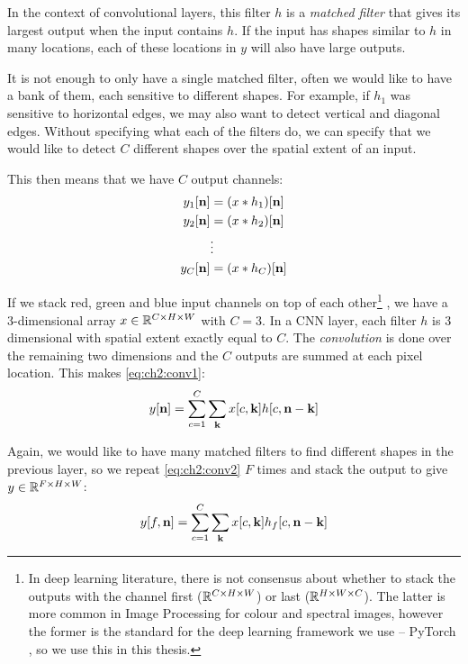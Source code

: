 In the context of convolutional layers, this filter $h$ is a \emph{matched filter} 
that gives its largest output when the input contains $h$. If the input has
shapes similar to $h$ in many locations, each of these locations in $y$ will
also have large outputs. 

It is not enough to only have a single matched filter, often we would like to
have a bank of them, each sensitive to different shapes. For example, if $h_1$
was sensitive to horizontal edges, we may also want to detect vertical and
diagonal edges. Without specifying what each of the filters do, we can 
specify that we would like to detect $C$ different shapes over the spatial
extent of an input.

This then means that we have $C$ output channels:
\begin{align}
  y_1[\nn] &= (x \conv h_1)[\nn] \\
  y_2[\nn] &= (x \conv h_2)[\nn] \\
           &\vdots  \\
  y_C[\nn] &= (x \conv h_C)[\nn] 
\end{align}

If we stack red, green and blue input channels on top of each other\footnote{In deep 
learning literature, there is not consensus about whether to stack the outputs
with the channel first ($\reals[C\x H\x W]$) or last ($\reals[H\x W\x C]$). The
latter is more common in Image Processing for colour and spectral images,
however the former is the standard for the deep learning framework we use --
PyTorch \cite{paszke_automatic_2017}, so we use this in this thesis.} , we have a 
3-dimensional array $x \in \reals[C\x H\x W]$ with $C=3$.
In a CNN layer, each filter $h$ is 3 dimensional with spatial extent exactly
equal to $C$. The \emph{convolution} is done over the remaining two dimensions
and the $C$ outputs are summed at each pixel location. This makes
\eqref{eq:ch2:conv1}:
\begin{equation}
  y[\nn] = \sum_{c=1}^C \sum_{\mathbf{k}} x[c, \mathbf{k}]h[c, \nn-\mathbf{k}]
  \label{eq:ch2:conv2}
\end{equation}

Again, we would like to have many matched filters to find different shapes in
the previous layer, so we repeat \eqref{eq:ch2:conv2} $F$ times and stack the
output to give $y \in \reals[F \x H\x W]$: 
%
\begin{equation}
  y[f, \nn] = \sum_{c=1}^C \sum_{\mathbf{k}} x[c, \mathbf{k}]h_f[c, \nn-\mathbf{k}]
  \label{eq:ch2:conv3}
\end{equation}

